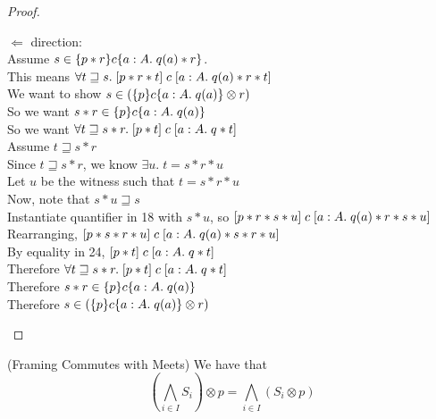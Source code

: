 \begin{proof}
\begin{tabbedproof}
\oooo $\Leftarrow$ direction: \\
\ooooo Assume $s \in \{{p * r}\}{c}\{{a:A}.\;{q(a) * r}\}$. \\
\oooooo This means $\forall t \sqsupseteq s.\; [{p * r * t}]\;{c}\;[{a:A}.\;{q(a) * r * t}]$ \\
\oooooo We want to show $s \in (\{{p}\}{c}\{{a:A}.\;{q(a)}\} \otimes r)$ \\
\oooooo So we want $s * r \in \{{p}\}{c}\{{a:A}.\;{q(a)}\}$ \\
\oooooo So we want $\forall t \sqsupseteq s * r.\; [{p * t}]\;{c}\;[{a:A}.\;{q * t}]$ \\
\oooooo Assume $t \sqsupseteq s * r$ \\
\ooooooo Since $t \sqsupseteq s * r$, we know $\exists u.\; t = s * r * u$ \\
\ooooooo Let $u$ be the witness such that $t = s * r * u$ \\
\ooooooo Now, note that $s * u \sqsupseteq s$ \\
\ooooooo Instantiate quantifier in 18 with $s * u$, so 
         $[{p * r * s * u}]\;{c}\;[{a:A}.\;{q(a) * r * s * u}]$ \\
\ooooooo Rearranging, $[{p * s * r * u}]\;{c}\;[{a:A}.\;{q(a) * s * r * u}]$ \\
\ooooooo By equality in 24, $[{p * t}]\;{c}\;[{a:A}.\;{q * t}]$ \\
\oooooo Therefore $\forall t \sqsupseteq s * r.\; [{p * t}]\;{c}\;[{a:A}.\;{q * t}]$ \\
\oooooo Therefore $s * r \in \{{p}\}{c}\{{a:A}.\;{q(a)}\}$ \\
\oooooo Therefore $s \in (\{{p}\}{c}\{{a:A}.\;{q(a)}\} \otimes r)$ 
\end{tabbedproof}
\end{proof}

\begin{lemma}{(Framing Commutes with Meets)}
We have that 
\begin{displaymath}
\left(\bigwedge_{i \in I} S_i\right) \otimes p = \bigwedge_{i \in I} (S_i \otimes p)
\end{displaymath}
\end{lemma}

